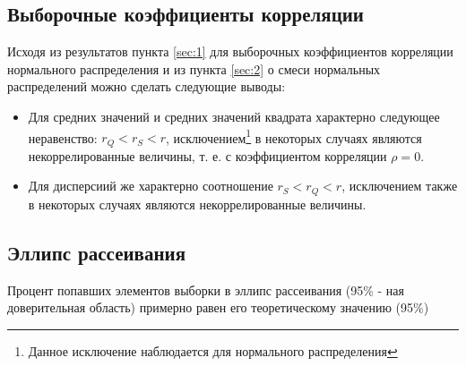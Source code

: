 \documentclass{article}
\begin{document}
\subsection{Выборочные коэффициенты корреляции}

Исходя из результатов пункта \ref{sec:1} для выборочных коэффициентов корреляции нормального распределения и из пункта \ref{sec:2} о смеси нормальных распределений можно сделать следующие выводы:

\begin{itemize}
	\item Для средних значений и средних значений квадрата характерно следующее неравенство: $r_Q < r_S < r$, исключением\footnote{Данное исключение наблюдается для нормального распределения} в некоторых случаях являются некоррелированные величины, т. е. с коэффициентом корреляции $\rho = 0$.
	\item Для дисперсиий же характерно соотношение $r_S < r_Q < r$, исключением также в некоторых случаях являются некоррелированные величины.
\end{itemize}

\subsection{Эллипс рассеивания}

Процент попавших элементов выборки в эллипс рассеивания (95\% - ная доверительная область) примерно равен его теоретическому значению (95\%)
\end{document}
